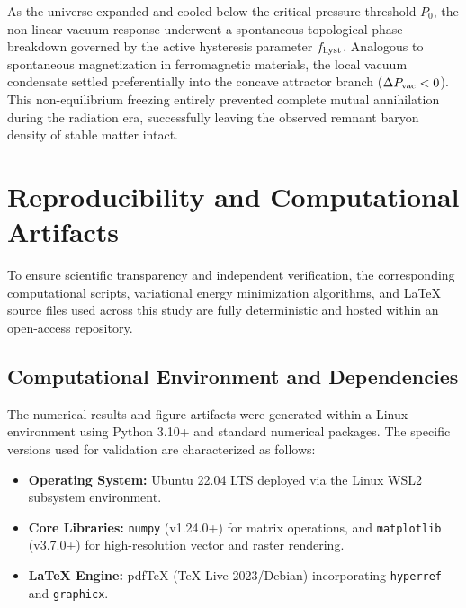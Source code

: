 \documentclass[
  reprint,
  aps,
  prd,
  twocolumn,
  superscriptaddress,
  nofootinbib,
  floatfix
]{revtex4-2}
\begin{document}
As the universe expanded and cooled below the critical pressure
threshold $P_0$, the non-linear vacuum response underwent a
spontaneous topological phase breakdown governed by the active
hysteresis parameter $f_{\rm hyst}$. Analogous to
spontaneous magnetization in ferromagnetic materials, the local
vacuum condensate settled preferentially into the concave
attractor branch ($\Delta P_{\rm vac} < 0$). This
non-equilibrium freezing entirely prevented complete mutual
annihilation during the radiation era, successfully leaving
the observed remnant baryon density of stable matter intact.

\section{Reproducibility and Computational Artifacts}
\label{sec:reproducibility}

To ensure scientific transparency and independent 
verification, the corresponding computational scripts, 
variational energy minimization algorithms, and LaTeX 
source files used across this study are fully 
deterministic and hosted within an open-access repository.


\subsection{Computational Environment and Dependencies}
\label{sec:environment}

The numerical results and figure artifacts were generated 
within a Linux environment using Python 3.10+ and standard 
numerical packages. The specific versions used for validation 
are characterized as follows:
\begin{itemize}
\item \textbf{Operating System:} Ubuntu 22.04 LTS 
deployed via the Linux WSL2 subsystem environment.
\item \textbf{Core Libraries:} \texttt{numpy} (v1.24.0+) 
for matrix operations, and \texttt{matplotlib} (v3.7.0+) 
for high-resolution vector and raster rendering.
\item \textbf{LaTeX Engine:} pdfTeX (TeX Live 2023/Debian) 
incorporating \texttt{hyperref} and \texttt{graphicx}.
\end{itemize}
\end{document}
